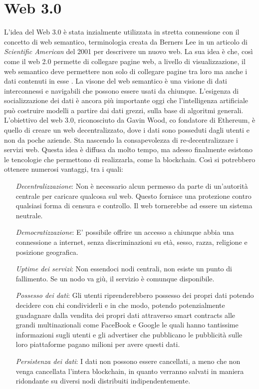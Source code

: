 \section{Web 3.0}
L'idea del Web 3.0 è stata inzialmente utilizzata in stretta connessione con il concetto di web semantico, terminologia creata da Berners Lee in un articolo di \textit{Scientific American} del 2001 per descrivere un nuovo web. 
La sua idea è che, così come il web 2.0 permette di collegare pagine web, a livello di visualizzazione, il web semantico deve permettere non solo di collegare pagine tra loro ma anche i dati contenuti in esse \cite{ted_youtube}.
La visone del web semantico è una visione di dati interconnessi e navigabili che possono essere usati da chiunque. L'esigenza di socializzazione dei dati è ancora più importante oggi che l'intelligenza artificiale può costruire modelli a partire dai dati grezzi, sulla base di algoritmi generali.
L'obiettivo del web 3.0, riconosciuto da Gavin Wood, co fondatore di Ethereum, è quello di creare un web decentralizzato, dove i dati sono posseduti dagli utenti e non da poche aziende. Sta nascendo la consapevolezza di re-decentralizzare i servizi web.
Questa idea è diffusa da molto tempo, ma adesso finalmente esistono le tencologie che permettono di realizzarla, come la blockchain.
Così si potrebbero ottenere numerosi vantaggi, tra i quali:
\begin{itemize}
    \item [\textit{Decentralizzazione}:] Non è necessario alcun permesso da parte di un'autorità centrale per caricare qualcosa sul web. Questo fornisce una protezione contro qualsiasi forma di censura e controllo. Il web tornerebbe ad essere un sistema neutrale.
    \item [\textit{Democratizzazione}:] E' possibile offrire un accesso a chiunque abbia una connessione a internet, senza discriminazioni su età, sesso, razza, religione e posizione geografica.
    \item [\textit{Uptime dei servizi}:] Non essendoci nodi centrali, non esiste un punto di fallimento. Se un nodo va giù, il servizio è comunque disponibile.
    \item [\textit{Possesso dei dati}:] Gli utenti riprenderebbero possesso dei propri dati potendo decidere con chi condividerli e in che modo, potendo potenzialmente guadagnare dalla vendita dei propri dati attraverso smart contracts alle grandi multinazionali come FaceBook e Google le quali hanno tantissime informazioni sugli utenti e gli advertiser che pubblicano le pubblicità sulle loro piattaforme pagano milioni per avere questi dati.
    \item [\textit{Persistenza dei dati}:] I dati non possono essere cancellati, a meno che non venga cancellata l'intera blockchain, in quanto verranno salvati in maniera ridondante su diversi nodi distribuiti indipendentemente.
\end{itemize}
